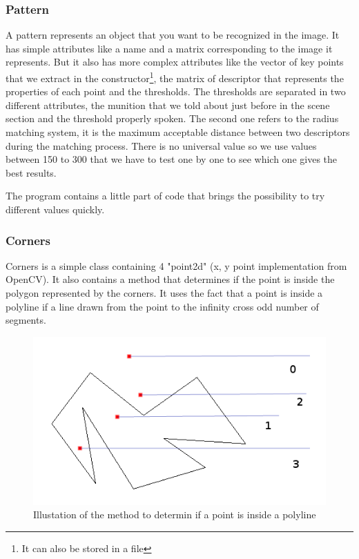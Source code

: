 \documentclass[english,a4paper,11pt]{report}
\begin{document}
	\subsubsection{Pattern}
	\par A pattern represents an object that you want to be recognized in the image. It has simple attributes like a name and a matrix corresponding to the image it represents. But it also has more complex attributes like the vector of key points that we extract in the constructor\footnote{It can also be stored in a file}, the matrix of descriptor that represents the properties of each point and the thresholds. The thresholds are separated in two different attributes, the munition that we told about just before in the scene section and the threshold properly spoken. The second one refers to the radius matching system, it is the maximum acceptable distance between two descriptors during the matching process. There is no universal value so we use values between 150 to 300 that we have to test one by one to see which one gives the best results.
 \par The program contains a little part of code that brings the possibility to try different values quickly.
	
	
	\subsubsection{Corners}
	\par Corners is a simple class containing 4 "point2d" (x, y point implementation from OpenCV).
It also contains a method that determines if the point is inside the polygon represented by the corners. It uses the fact that a point is inside a polyline if a line drawn from the point to the infinity cross odd number of segments.
	\begin{figure}[h]
		\begin{center}
			\includegraphics[scale=0.7]{images_not_compressed/isIn.png}
			\caption{Illustation of the method to determin if a point is inside a polyline}
		\end{center}
	\end{figure}
		
	
	
	

	\listoffigures

	{}
	
	
\end{document}

